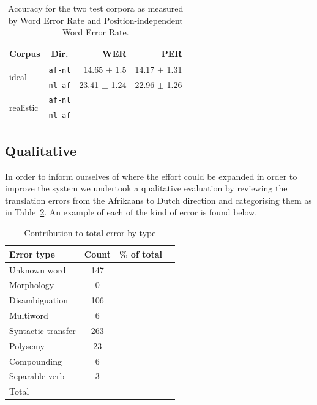 \documentclass[11pt]{article}
\begin{document}
\begin{table}
  \begin{center}
  \begin{tabular}{|l|c|r|r|}
   \hline
   {\bf Corpus}                & {\bf Dir.}  & {\bf WER}    & {\bf PER}\\
   \hline
   \multirow{2}{*}{ideal}      &  {\small {\tt af-nl}}      & 14.65 $\pm$ 1.5        &  14.17 $\pm$ 1.31 \\ 
                               &  {\small {\tt nl-af}}      & 23.41 $\pm$ 1.24     & 22.96 $\pm$ 1.26 \\
   \hline
   \multirow{2}{*}{realistic}  &  {\small {\tt af-nl}}      &              &  ~ \\ 
                               &  {\small {\tt nl-af}}      &              & ~ \\
   \hline
  \end{tabular}
    \caption{Accuracy for the two test corpora as measured by Word Error Rate 
        and Position-independent Word Error Rate.}
    \label{table:quan}
  \end{center}
\end{table}


\subsection{Qualitative}

In order to inform ourselves of where the effort could be expanded in order to improve the 
system we undertook a qualitative evaluation by reviewing the translation errors from the Afrikaans
to Dutch direction and categorising them as in Table~\ref{table:qual}. An example of each 
of the kind of error is found below.

\begin{table}
  \begin{center}
  \begin{tabular}{|l|c|r|r|}
     \hline
     {\bf Error type}    & {\bf Count} & {\bf \% of total} \\
     \hline
     Unknown word        & 147         & \\
     Morphology          & 0           & \\
     Disambiguation      & 106         & \\
     Multiword           & 6           & \\
     Syntactic transfer  & 263         & \\
     Polysemy            & 23          & \\
     Compounding         & 6           & \\
     Separable verb      & 3           & \\
     \hline
     Total               &             & \\
     \hline
  \end{tabular}
    \caption{Contribution to total error by type}
    \label{table:qual}
  \end{center}
\end{table}
\end{document}
